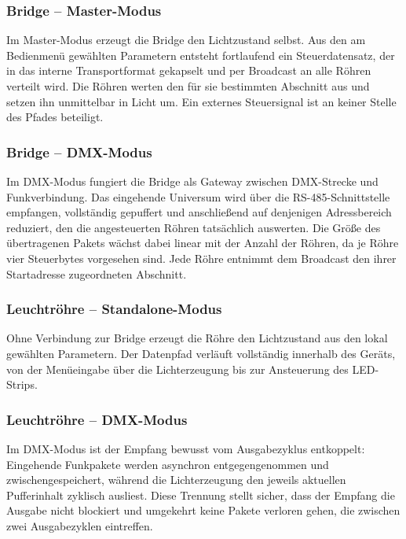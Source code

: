 \subsubsection{Bridge -- Master-Modus}

Im Master-Modus erzeugt die Bridge den Lichtzustand selbst. Aus den am Bedienmenü
gewählten Parametern entsteht fortlaufend ein Steuerdatensatz, der in das interne
Transportformat gekapselt und per Broadcast an alle Röhren verteilt wird. Die Röhren
werten den für sie bestimmten Abschnitt aus und setzen ihn unmittelbar in Licht um. Ein
externes Steuersignal ist an keiner Stelle des Pfades beteiligt.

\subsubsection{Bridge -- DMX-Modus}

Im DMX-Modus fungiert die Bridge als Gateway zwischen DMX-Strecke und Funkverbindung. Das
eingehende Universum wird über die RS-485-Schnittstelle empfangen, vollständig gepuffert
und anschließend auf denjenigen Adressbereich reduziert, den die angesteuerten Röhren
tatsächlich auswerten. Die Größe des übertragenen Pakets wächst dabei linear mit der
Anzahl der Röhren, da je Röhre vier Steuerbytes vorgesehen sind. Jede Röhre entnimmt dem
Broadcast den ihrer Startadresse zugeordneten Abschnitt.

\subsubsection{Leuchtröhre -- Standalone-Modus}

Ohne Verbindung zur Bridge erzeugt die Röhre den Lichtzustand aus den lokal gewählten
Parametern. Der Datenpfad verläuft vollständig innerhalb des Geräts, von der
Menüeingabe über die Lichterzeugung bis zur Ansteuerung des LED-Strips.

\subsubsection{Leuchtröhre -- DMX-Modus}

Im DMX-Modus ist der Empfang bewusst vom Ausgabezyklus entkoppelt: Eingehende Funkpakete
werden asynchron entgegengenommen und zwischengespeichert, während die Lichterzeugung
den jeweils aktuellen Pufferinhalt zyklisch ausliest. Diese Trennung stellt sicher, dass
der Empfang die Ausgabe nicht blockiert und umgekehrt keine Pakete verloren gehen, die
zwischen zwei Ausgabezyklen eintreffen.

